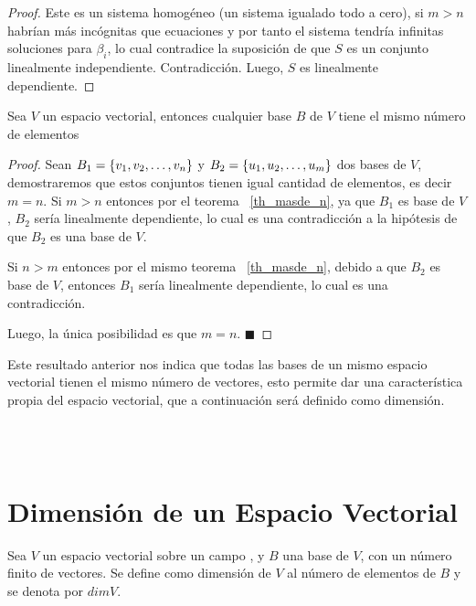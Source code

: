 \begin{proof}
Este es un sistema homogéneo (un sistema igualado todo a cero), si $m>n$ habrían más incógnitas que ecuaciones y por tanto el sistema tendría infinitas soluciones para $\beta_i$, lo cual contradice la suposición de que $S$ es un conjunto linealmente independiente. Contradicción. Luego, $S$ es linealmente dependiente.

\end{proof}

\begin{theorem}
Sea $V$ un espacio vectorial, entonces cualquier base $B$ de $V$ tiene el mismo número de elementos
\end{theorem}

\begin{proof}
Sean $B_1= \lbrace v_1, v_2, \ldots, v_n \rbrace$ y $B_2= \lbrace u_1, u_2, \ldots, u_m \rbrace$ dos bases de $V$, demostraremos que estos conjuntos tienen igual cantidad de elementos, es decir $m=n$.
Si $m>n$ entonces por el teorema ~\ref{th_masde_n}, ya que $B_1$ es base de $V$, $B_2$ ser\'ia linealmente dependiente, lo cual es una contradicción a la hipótesis de que $B_2$ es una base de $V$.

Si $n>m$ entonces por el mismo teorema ~\ref{th_masde_n}, debido a que $B_2$ es base de $V$, entonces $B_1$ ser\'ia linealmente dependiente, lo cual es una contradicción.

Luego, la única posibilidad es que $m=n$. $\blacksquare$
\end{proof}

Este resultado anterior nos indica que todas las bases de un mismo espacio vectorial tienen el mismo número de vectores, esto permite dar una caracter\'istica propia del espacio vectorial, que a continuación ser\'a definido como dimensión.

~\\
~\\
\newpage
\section{Dimensión de un Espacio Vectorial}
\begin{dfn}[Dimensión]
Sea $V$ un espacio vectorial sobre un campo \doblek, y $B$ una base de $V$, con un número finito de vectores. Se define como dimensión de $V$ al número de elementos de $B$ y se denota por $dimV$.
~\\
\end{dfn}

